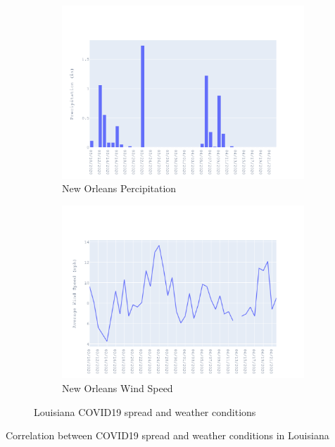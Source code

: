 \documentclass{homework}
\begin{document}
\begin{figure}[H]
  \begin{subfigure}{0.45\linewidth}
    \includegraphics[width=\linewidth]{task4/Louisiana_rain.png}
    \caption{New Orleans Percipitation}
  \end{subfigure}
  \hfil
  \begin{subfigure}{0.45\linewidth}
    \includegraphics[width=\linewidth]{task4/Louisiana_wnd.png}
    \caption{New Orleans Wind Speed}
  \end{subfigure}

  \caption{Louisiana COVID19 spread and weather conditions}
  \label{fig:task4CA}
\end{figure}

\begin{table}[H]
  \caption{Correlation between COVID19 spread and weather conditions in Louisiana}
  \label{Task 4 Louisiana}
  \centering
  
\end{table}
\end{document}
